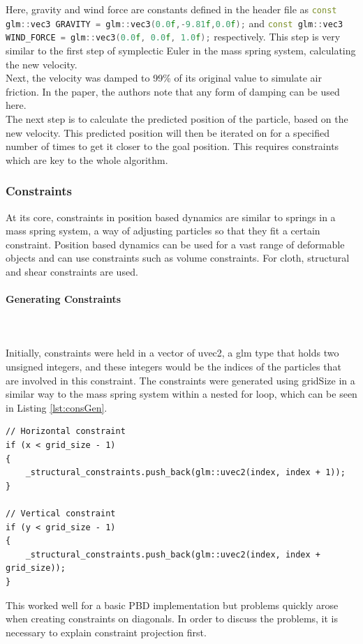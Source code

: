 \documentclass[12pt,a4paper]{article}
\begin{document}
Here, gravity and wind force are constants defined in the header file as \lstinline[language=C++]!const glm::vec3 GRAVITY = glm::vec3(0.0f,-9.81f,0.0f);! and \lstinline[language=C++]!const glm::vec3 WIND_FORCE = glm::vec3(0.0f, 0.0f, 1.0f);! respectively. This step is very similar to the first step of symplectic Euler in the mass spring system, calculating the new velocity. \\

Next, the velocity was damped to 99\% of its original value to simulate air friction. In the paper, the authors note that any form of damping can be used here. \\

The next step is to calculate the predicted position of the particle, based on the new velocity. This predicted position will then be iterated on for a specified number of times to get it closer to the goal position. This requires constraints which are key to the whole algorithm.
\subsubsection{Constraints}
\label{constraints} 
At its core, constraints in position based dynamics are similar to springs in a mass spring system, a way of adjusting particles so that they fit a certain constraint. Position based dynamics can be used for a vast range of deformable objects and can use constraints such as volume constraints. For cloth, structural and shear constraints are used.
\paragraph{Generating Constraints}\mbox{} \\ \\
Initially, constraints were held in a vector of uvec2, a glm type that holds two unsigned integers, and these integers would be the indices of the particles that are involved in this constraint. The constraints were generated using gridSize in a similar way to the mass spring system within a nested for loop, which can be seen in Listing \ref{lst:consGen}. 
\begin{lstlisting}[caption={The inner loop for constraint generation},label={lst:consGen}]
// Horizontal constraint
if (x < grid_size - 1)
{
	_structural_constraints.push_back(glm::uvec2(index, index + 1));
}

// Vertical constraint
if (y < grid_size - 1)
{
	_structural_constraints.push_back(glm::uvec2(index, index + grid_size));
}
\end{lstlisting}
This worked well for a basic PBD implementation but problems quickly arose when creating constraints on diagonals. In order to discuss the problems, it is necessary to explain constraint projection first. 
\end{document}
